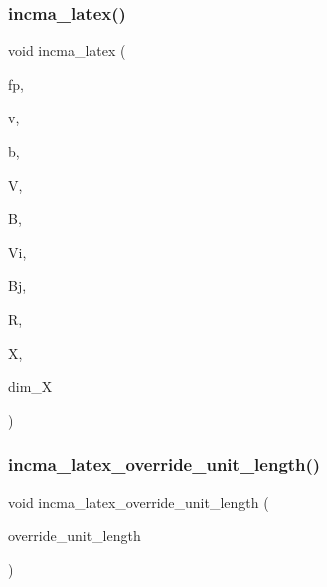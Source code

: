 \subsubsection{\texorpdfstring{incma\+\_\+latex()}{incma\_latex()}}
{\footnotesize\ttfamily void incma\+\_\+latex (\begin{DoxyParamCaption}\item[{ostream \&}]{fp,  }\item[{\mbox{\hyperlink{galois_8h_a09fddde158a3a20bd2dcadb609de11dc}{I\+NT}}}]{v,  }\item[{\mbox{\hyperlink{galois_8h_a09fddde158a3a20bd2dcadb609de11dc}{I\+NT}}}]{b,  }\item[{\mbox{\hyperlink{galois_8h_a09fddde158a3a20bd2dcadb609de11dc}{I\+NT}}}]{V,  }\item[{\mbox{\hyperlink{galois_8h_a09fddde158a3a20bd2dcadb609de11dc}{I\+NT}}}]{B,  }\item[{\mbox{\hyperlink{galois_8h_a09fddde158a3a20bd2dcadb609de11dc}{I\+NT}} $\ast$}]{Vi,  }\item[{\mbox{\hyperlink{galois_8h_a09fddde158a3a20bd2dcadb609de11dc}{I\+NT}} $\ast$}]{Bj,  }\item[{\mbox{\hyperlink{galois_8h_a09fddde158a3a20bd2dcadb609de11dc}{I\+NT}} $\ast$}]{R,  }\item[{\mbox{\hyperlink{galois_8h_a09fddde158a3a20bd2dcadb609de11dc}{I\+NT}} $\ast$}]{X,  }\item[{\mbox{\hyperlink{galois_8h_a09fddde158a3a20bd2dcadb609de11dc}{I\+NT}}}]{dim\+\_\+X }\end{DoxyParamCaption})}

\mbox{\label{_g_a_l_o_i_s_2incidence__structure_8_c_a9ad5ef999b6c21eb42b7f5a740f7c6df}} 
\subsubsection{\texorpdfstring{incma\+\_\+latex\+\_\+override\+\_\+unit\+\_\+length()}{incma\_latex\_override\_unit\_length()}}
{\footnotesize\ttfamily void incma\+\_\+latex\+\_\+override\+\_\+unit\+\_\+length (\begin{DoxyParamCaption}\item[{const \mbox{\hyperlink{galois_8h_ab6cc7b4aeb6ea31aba2b3fbfc83ff5e6}{B\+Y\+TE}} $\ast$}]{override\+\_\+unit\+\_\+length }\end{DoxyParamCaption})}

